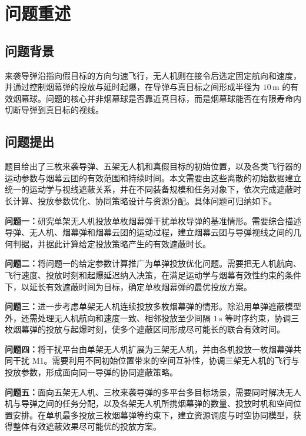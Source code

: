 \section{问题重述}

\subsection{问题背景}

来袭导弹沿指向假目标的方向匀速飞行，无人机则在接令后选定固定航向和速度，并通过控制烟幕弹的投放与延时起爆，在导弹与真目标之间形成半径为 $10\,\mathrm{m}$ 的有效烟幕球。问题的核心并非烟幕球是否靠近真目标，而是烟幕球能否在有限寿命内切断导弹到真目标的视线。

\subsection{问题提出}

题目给出了三枚来袭导弹、五架无人机和真假目标的初始位置，以及各类飞行器的运动参数与烟幕云团的有效范围和持续时间。本文需要由这些离散的初始数据建立统一的运动学与视线遮蔽关系，并在不同装备规模和任务对象下，依次完成遮蔽时长计算、投放参数优化、协同策略设计与资源分配。具体问题可归纳如下。

\textbf{问题一：}研究单架无人机投放单枚烟幕弹干扰单枚导弹的基准情形。需要综合描述导弹、无人机、烟幕弹和烟幕云团的运动过程，建立烟幕云团与导弹视线之间的几何判据，并据此计算给定投放策略产生的有效遮蔽时长。

\textbf{问题二：}将问题一的给定参数计算推广为单弹投放优化问题。需要把无人机航向、飞行速度、投放时刻和起爆延迟纳入决策，在满足运动学与烟幕有效性约束的条件下，以延长有效遮蔽时间为目标，确定单枚烟幕弹的最优投放方案。

\textbf{问题三：}进一步考虑单架无人机连续投放多枚烟幕弹的情形。除沿用单弹遮蔽模型外，还需处理无人机航向和速度一致、相邻投放至少间隔 $1\,\mathrm{s}$ 等时序约束，协调三枚烟幕弹的投放与起爆时刻，使多个遮蔽区间形成尽可能长的联合有效时间。

\textbf{问题四：}将干扰平台由单架无人机扩展为三架无人机，并由各机投放一枚烟幕弹共同干扰 M1。需要利用不同初始位置带来的空间互补性，协调三架无人机的飞行与投放参数，形成面向同一导弹的协同遮蔽策略。

\textbf{问题五：}面向五架无人机、三枚来袭导弹的多平台多目标场景，需要同时解决无人机与导弹之间的任务分配，以及各架无人机所携烟幕弹的数量、投放时机和空间位置安排。在单机最多投放三枚烟幕弹等约束下，建立资源调度与时空协同模型，获得整体有效遮蔽效果尽可能优的投放方案。

